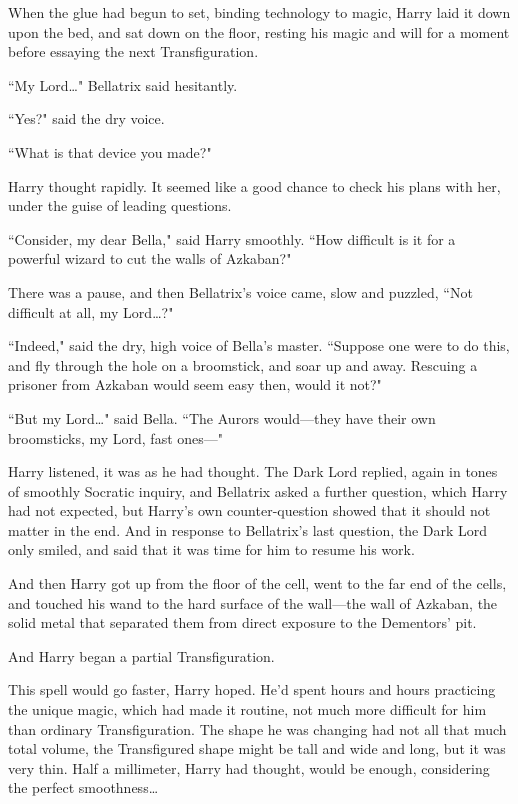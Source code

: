 When the glue had begun to set, binding technology to magic, Harry laid it down upon the bed, and sat down on the floor, resting his magic and will for a moment before essaying the next Transfiguration.

``My Lord{\ldots}" Bellatrix said hesitantly.

``Yes?" said the dry voice.

``What is that device you made?"

Harry thought rapidly. It seemed like a good chance to check his plans with her, under the guise of leading questions.

``Consider, my dear Bella," said Harry smoothly. ``How difficult is it for a powerful wizard to cut the walls of Azkaban?"

There was a pause, and then Bellatrix's voice came, slow and puzzled, ``Not difficult at all, my Lord{\ldots}?"

``Indeed," said the dry, high voice of Bella's master. ``Suppose one were to do this, and fly through the hole on a broomstick, and soar up and away. Rescuing a prisoner from Azkaban would seem easy then, would it not?"

``But my Lord{\ldots}" said Bella. ``The Aurors would—they have their own broomsticks, my Lord, fast ones—"

Harry listened, it was as he had thought. The Dark Lord replied, again in tones of smoothly Socratic inquiry, and Bellatrix asked a further question, which Harry had not expected, but Harry's own counter-question showed that it should not matter in the end. And in response to Bellatrix's last question, the Dark Lord only smiled, and said that it was time for him to resume his work.

And then Harry got up from the floor of the cell, went to the far end of the cells, and touched his wand to the hard surface of the wall—the wall of Azkaban, the solid metal that separated them from direct exposure to the Dementors' pit.

And Harry began a partial Transfiguration.

This spell would go faster, Harry hoped. He'd spent hours and hours practicing the unique magic, which had made it routine, not much more difficult for him than ordinary Transfiguration. The shape he was changing had not all that much total volume, the Transfigured shape might be tall and wide and long, but it was very thin. Half a millimeter, Harry had thought, would be enough, considering the perfect smoothness{\ldots}

